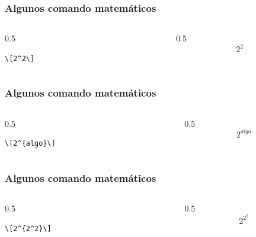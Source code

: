 \documentclass[12pt,aspectratio=169,ignorenonframetext]{ltxbeamer}
\begin{document}
\begin{frame}[fragile]
\frametitle{Algunos comando matemáticos}

\begin{columns}
    \begin{column}{0.5\textwidth}
        \begin{verbatim}
\[2^2\]
        \end{verbatim}
    \end{column}
    {\color{gray} \vline}
    \begin{column}{0.5\textwidth}
        \[2^2\]
    \end{column}
\end{columns}
\end{frame}





\begin{frame}[fragile]
\frametitle{Algunos comando matemáticos}

\begin{columns}
    \begin{column}{0.5\textwidth}
        \begin{verbatim}
\[2^{algo}\]
        \end{verbatim}
    \end{column}
    {\color{gray} \vline}
    \begin{column}{0.5\textwidth}
        \[2^{algo}\]
    \end{column}
\end{columns}
\end{frame}





\begin{frame}[fragile]
\frametitle{Algunos comando matemáticos}

\begin{columns}
    \begin{column}{0.5\textwidth}
        \begin{verbatim}
\[2^{2^2}\]
        \end{verbatim}
    \end{column}
    {\color{gray} \vline}
    \begin{column}{0.5\textwidth}
        \[2^{2^2}\]
    \end{column}
\end{columns}
\end{frame}
\end{document}
